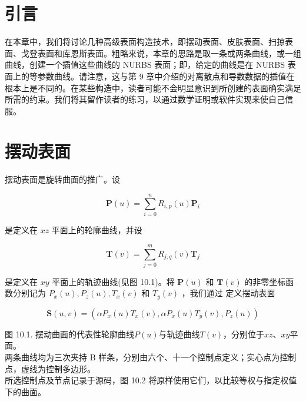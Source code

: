 \documentclass[../main.tex]{subfiles}
\begin{document}
              


\section{引言}

在本章中，我们将讨论几种高级表面构造技术，即摆动表面、皮肤表面、扫掠表面、戈登表面和库恩斯表面。粗略来说，本章的思路是取一条或两条曲线，或一组曲线，创建一个插值这些曲线的 NURBS 表面；即，给定的曲线是在 NURBS 表面上的等参数曲线。请注意，这与第 9 章中介绍的对离散点和导数数据的插值在根本上是不同的。在某些构造中，读者可能不会明显意识到所创建的表面确实满足所需的约束。我们将其留作读者的练习，以通过数学证明或软件实现来使自己信服。

\section{摆动表面}
摆动表面是旋转曲面的推广。设

\[
\mathbf{P}\left( u\right)  = \mathop{\sum }\limits_{{i = 0}}^{n}{R}_{i,p}\left( u\right) {\mathbf{P}}_{i} \tag{10.1}
\]

是定义在 \({xz}\) 平面上的轮廓曲线，并设

\[
\mathbf{T}\left( v\right)  = \mathop{\sum }\limits_{{j = 0}}^{m}{R}_{j,q}\left( v\right) {\mathbf{T}}_{j} \tag{10.2}
\]

是定义在 \({xy}\) 平面上的轨迹曲线(见图 10.1)。将 \(\mathbf{P}\left( u\right)\) 和 \(\mathbf{T}\left( v\right)\) 的非零坐标函数分别记为 \({P}_{x}\left( u\right) ,{P}_{z}\left( u\right) ,{T}_{x}\left( v\right)\) 和 \({T}_{y}\left( v\right)\) ，我们通过 \cite{Wood87} 定义摆动表面

\[
\mathbf{S}\left( {u,v}\right)  = \left( {\alpha {P}_{x}\left( u\right) {T}_{x}\left( v\right) ,\alpha {P}_{x}\left( u\right) {T}_{y}\left( v\right) ,{P}_{z}\left( u\right) }\right)  \tag{10.3}
\]

\begin{center}
\begin{minipage}{24cm}
\vspace*{.6\baselineskip}
\centering
{}
\par\smallskip
图 10.1. 摆动曲面的代表性轮廓曲线$P(u)$与轨迹曲线$T(v)$，分别位于$xz$、$xy$平面。\\
两条曲线均为三次夹持 B 样条，分别由六个、十一个控制点定义；实心点为控制点，虚线为控制多边形。\\
所选控制点及节点记录于源码，图 10.2 将原样使用它们，以比较等权与指定权值下的曲面。
\end{minipage}
\end{center}
\end{document}
